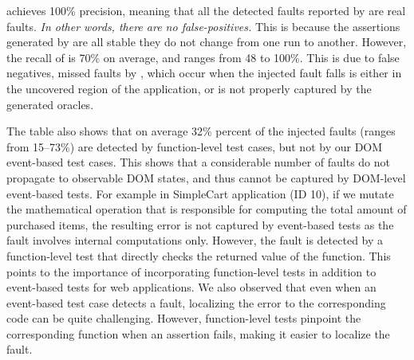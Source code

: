 \tool achieves 100\% precision, meaning that all the detected faults reported by \tool are real faults. {\em In other words, there are no false-positives.}
This is because the assertions generated by \tool are all stable \ie they do not change from one run to another. %
However, the recall of \tool is 70\% on average, and ranges from 48 to 100\%. This is due to false negatives, \ie missed faults by \tool, 
which occur when the injected fault falls is either in the uncovered region of the application, or is not properly captured by the generated oracles.  


The table also shows that on average 32\% percent of the injected faults (ranges from 15--73\%) are detected by function-level test cases, but not by our DOM event-based test cases. This shows that a considerable number of faults do not propagate to observable DOM states, and thus cannot be captured by DOM-level event-based tests. 
For example in SimpleCart application (ID 10), if we mutate the mathematical operation that is responsible for computing the total amount of purchased items, the resulting error is not captured by event-based tests as the fault involves internal computations only. However, the fault is detected by a function-level test that directly checks the returned value of the function.
This points to the importance of incorporating function-level tests in addition to event-based tests for \javascript web applications. We also observed that even when an event-based test case detects a \javascript fault, localizing the error to the corresponding \javascript code can be quite challenging. However, function-level tests pinpoint the  corresponding function when an assertion fails, making it easier to localize the fault. 

